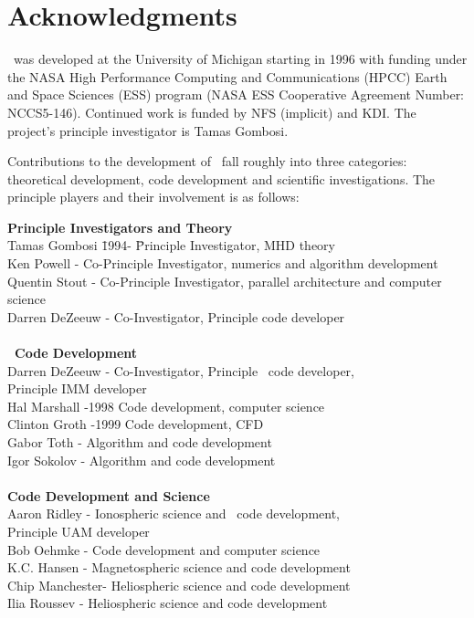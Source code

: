 \section{Acknowledgments}

\BATSRUS\ was developed at the University of Michigan starting in 1996
with funding under the NASA High Performance Computing and Communications (HPCC)
Earth and Space Sciences (ESS) program (NASA ESS Cooperative Agreement 
Number: NCCS5-146).  Continued work is funded by NFS (implicit) and KDI.
The project's principle investigator is Tamas Gombosi.

Contributions to the development of \BATSRUS\ fall roughly into three
categories: theoretical development, code development and scientific
investigations.   The principle players and their involvement is as follows:

\begin{tabbing}
{\bf Principle Investigators and Theory} \\
Tamas Gombosi \hspace{.25in} \= 1994- \hspace{0.35in} \= 
                          Principle Investigator, MHD theory \\
Ken Powell     -     \> Co-Principle Investigator, numerics and algorithm development \\
Quentin Stout  -     \> Co-Principle Investigator, 
                          parallel architecture and computer science \\
Darren DeZeeuw -     \> Co-Investigator, Principle code developer \\
\> \> \\
{\bf \BATSRUS\ Code Development} \\
Darren DeZeeuw -     \> Co-Investigator, Principle \BATSRUS\ code developer, \\
               \>           \> Principle IMM developer  \\
Hal Marshall   -1998 \> Code development, computer science \\
Clinton Groth  -1999 \> Code development, CFD \\ 
Gabor Toth     -     \> Algorithm and code development \\
Igor Sokolov   -     \> Algorithm and code development \\
\> \> \\
{\bf Code Development and Science} \\
Aaron Ridley   -     \> Ionospheric science and \BATSRUS\ code development,\\
               \>           \> Principle UAM developer \\
Bob Oehmke     -     \> Code development and computer science \\
K.C. Hansen    -     \> Magnetospheric science and code development \\
Chip Manchester-     \> Heliospheric science and code development \\
Ilia Roussev   -     \> Heliospheric science and code development
\end{tabbing}

